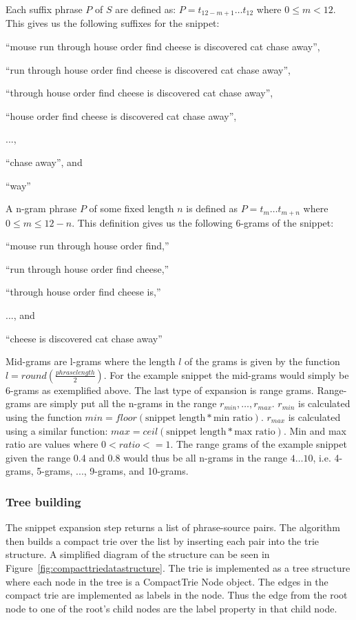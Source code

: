 Each suffix phrase \(P\)  of \(S\) are defined as: \(P = t_{12-m+1} \dots t_{12}\) where \(0 \le m < 12\). This gives us the following suffixes for the snippet:
\begin{inparaenum}[\itshape 1\upshape)]
\item ``mouse run through house order find cheese is discovered cat chase away'',
\item ``run through house order find cheese is discovered cat chase away'',
\item ``through house order find cheese is discovered cat chase away'',
\item ``house order find cheese is discovered cat chase away'',
\item ...,
\item ``chase away'', and
\item ``way''
\end{inparaenum}


A n-gram phrase \(P\) of some fixed length \(n\) is defined as \(P = t_{m} \dots t_{m+n}\) where \(0 \le m \le 12 - n\). This definition gives us the following 6-grams of the snippet:
\begin{inparaenum}[\itshape 1\upshape)]
\item ``mouse run through house order find,''
\item ``run through house order find cheese,''
\item ``through house order find cheese is,''
\item ..., and
\item ``cheese is discovered cat chase away''
\end{inparaenum}

Mid-grams are l-grams where the length \(l\) of the grams is given by the function \(l = round(\frac{phrase length}{2})\). For the example snippet the mid-grams would simply be 6-grams as exemplified above. The last type of expansion is range grams. Range-grams are simply put all the n-grams in the range \(r_{min}, \dots, r_{max}\). \(r_{min}\) is calculated using the function \(min = floor(\text{snippet length} * \text{min~ratio})\). \(r_{max}\) is calculated using a similar function: \(max = ceil(\text{snippet length} * \text{max~ratio})\).  Min and max ratio are values where \(0 < ratio <= 1\). The range grams of the example snippet given the range 0.4 and 0.8 would thus be all n-grams in the range \(4 \dots 10\), i.e. 4-grams, 5-grams, ..., 9-grams, and 10-grams.

\subsubsection{Tree building}
The snippet expansion step returns a list of phrase-source pairs. The algorithm then builds a compact trie over the list by inserting each pair into the trie structure. A simplified diagram of the structure can be seen in Figure~\ref{fig:compacttriedatastructure}. The trie is implemented as a tree structure where each node in the tree is a CompactTrie Node object. The edges in the compact trie are implemented as labels in the node. Thus the edge from the root node to one of the root's child nodes are the label property in that child node.


